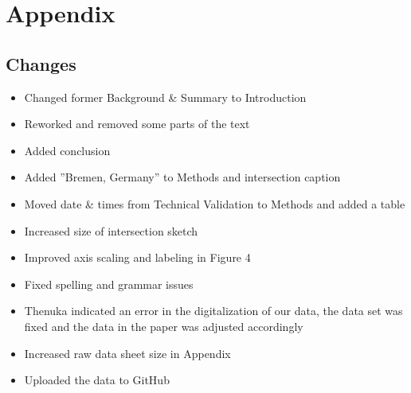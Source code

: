 \section{Appendix}
\subsection{Changes}
\begin{itemize}
    \item Changed former Background \& Summary to Introduction 
    \item Reworked and removed some parts of the text
    \item Added conclusion
    \item Added ''Bremen, Germany'' to Methods and intersection caption
    \item Moved date \& times from Technical Validation to Methods and added a table
    \item Increased size of intersection sketch 
    \item Improved axis scaling and labeling in Figure 4 
    \item Fixed spelling and grammar issues
    \item Thenuka indicated an error in the digitalization of our data, the data set was fixed and the data in the paper was adjusted accordingly
    \item Increased raw data sheet size in Appendix
    \item Uploaded the data to GitHub
    
\end{itemize}
\label{sec:Section 5}

